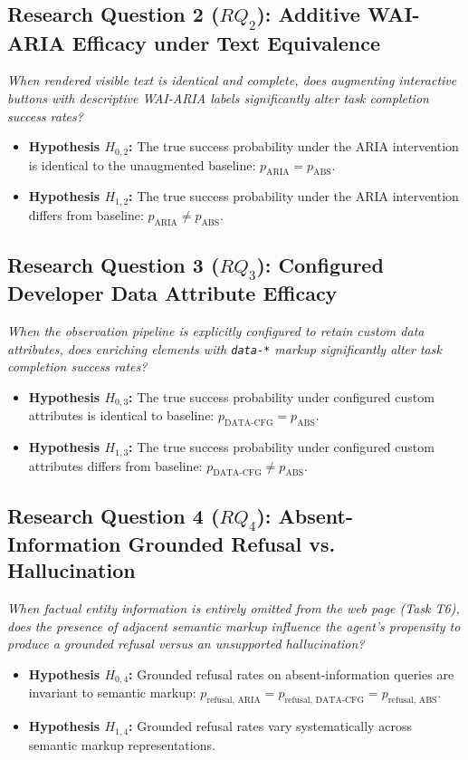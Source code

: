 \documentclass[11pt,a4paper]{article}
\begin{document}
\subsection{Research Question 2 ($RQ_2$): Additive WAI-ARIA Efficacy under Text Equivalence}
\textit{When rendered visible text is identical and complete, does augmenting interactive buttons with descriptive WAI-ARIA labels significantly alter task completion success rates?}
\begin{itemize}
    \item \textbf{Hypothesis $H_{0,2}$:} The true success probability under the \textsc{ARIA} intervention is identical to the unaugmented baseline: $p_{\text{ARIA}} = p_{\text{ABS}}$.
    \item \textbf{Hypothesis $H_{1,2}$:} The true success probability under the \textsc{ARIA} intervention differs from baseline: $p_{\text{ARIA}} \neq p_{\text{ABS}}$.
\end{itemize}

\subsection{Research Question 3 ($RQ_3$): Configured Developer Data Attribute Efficacy}
\textit{When the observation pipeline is explicitly configured to retain custom data attributes, does enriching elements with \texttt{data-*} markup significantly alter task completion success rates?}
\begin{itemize}
    \item \textbf{Hypothesis $H_{0,3}$:} The true success probability under configured custom attributes is identical to baseline: $p_{\text{DATA-CFG}} = p_{\text{ABS}}$.
    \item \textbf{Hypothesis $H_{1,3}$:} The true success probability under configured custom attributes differs from baseline: $p_{\text{DATA-CFG}} \neq p_{\text{ABS}}$.
\end{itemize}

\subsection{Research Question 4 ($RQ_4$): Absent-Information Grounded Refusal vs. Hallucination}
\textit{When factual entity information is entirely omitted from the web page (Task T6), does the presence of adjacent semantic markup influence the agent's propensity to produce a grounded refusal versus an unsupported hallucination?}
\begin{itemize}
    \item \textbf{Hypothesis $H_{0,4}$:} Grounded refusal rates on absent-information queries are invariant to semantic markup: $p_{\text{refusal, ARIA}} = p_{\text{refusal, DATA-CFG}} = p_{\text{refusal, ABS}}$.
    \item \textbf{Hypothesis $H_{1,4}$:} Grounded refusal rates vary systematically across semantic markup representations.
\end{itemize}
\end{document}
